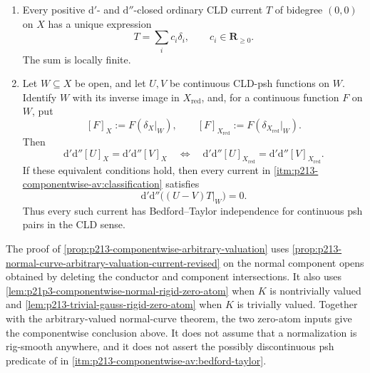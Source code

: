 \begin{proposition}
\begin{enumerate}
\item\label{itm:p213-componentwise-av:classification}
Every positive $\mathrm d'$- and $\mathrm d''$-closed ordinary CLD current
$T$ of bidegree $(0,0)$ on $X$ has a unique expression
\begin{equation}
 \label{eq:p213-componentwise-av-classification}
                         T=\sum_i c_i\delta_i,
                         \qquad c_i\in\mathbf R_{\geq0}.
\end{equation}
The sum is locally finite.

\item\label{itm:p213-componentwise-av:bedford-taylor}
Let $W\subseteq X$ be open, and let $U,V$ be continuous CLD-psh functions
on $W$.  Identify $W$ with its inverse image in $X_{\mathrm{red}}$, and,
for a continuous function $F$ on $W$, put
\[
 [F]_X:=F(\delta_X|_W),
 \qquad
 [F]_{X_{\mathrm{red}}}:=
      F(\delta_{X_{\mathrm{red}}}|_W).
\]
Then
\begin{equation}
 \label{eq:p213-componentwise-av-curvature-equivalence}
 \mathrm d'\mathrm d''[U]_X=\mathrm d'\mathrm d''[V]_X
 \quad\Longleftrightarrow\quad
 \mathrm d'\mathrm d''[U]_{X_{\mathrm{red}}}
  =\mathrm d'\mathrm d''[V]_{X_{\mathrm{red}}}.
\end{equation}
If these equivalent conditions hold, then every current in
\cref{itm:p213-componentwise-av:classification} satisfies
\begin{equation}
 \label{eq:p213-componentwise-av-bt-conclusion}
             \mathrm d'\mathrm d''\bigl((U-V)T|_W\bigr)=0.
\end{equation}
Thus every such current has Bedford--Taylor independence for continuous
psh pairs in the CLD sense.
\end{enumerate}
\end{proposition}

\begin{remark}
\label{rem:p213-componentwise-av-scope}
The proof of
\cref{prop:p213-componentwise-arbitrary-valuation} uses
\cref{prop:p213-normal-curve-arbitrary-valuation-current-revised} on the normal
component opens obtained by deleting the conductor and component
intersections.  It also uses
\cref{lem:p21p3-componentwise-normal-rigid-zero-atom} when $K$ is
nontrivially valued and
\cref{lem:p213-trivial-gauss-rigid-zero-atom} when $K$ is trivially
valued.  Together with the arbitrary-valued normal-curve theorem, the two
zero-atom inputs give the componentwise conclusion above.
It does not assume that a normalization is rig-smooth anywhere, and it
does not assert the possibly discontinuous psh predicate of
\cite[Definition~8.6.2]{CLD25} in
\cref{itm:p213-componentwise-av:bedford-taylor}.
\end{remark}
